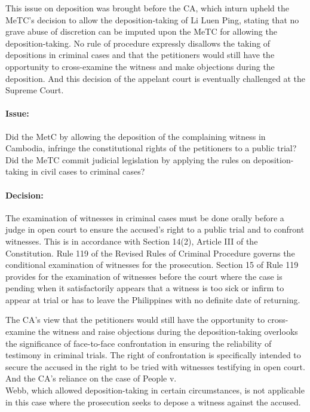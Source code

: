 \documentclass[
12pt,
oneside,
onehalfspacing,
headsepline
]{DigestCollection}
\begin{document}
This issue on deposition was brought before the CA, which inturn upheld the MeTC's decision to allow the deposition-taking of Li Luen Ping, stating that no grave abuse of discretion can be imputed upon the MeTC for allowing the deposition-taking. No rule of procedure expressly disallows the taking of depositions in criminal cases and that the petitioners would still have the opportunity to cross-examine the witness and make objections during the deposition. And this decision of the appelant court is eventually challenged at the Supreme Court.

\paragraph{Issue:}
\label{fa28abc0-09fd-11ef-932c-63c852f65e48}


Did the MetC by allowing the deposition of the complaining witness in Cambodia, infringe the constitutional rights of the petitioners to a public trial? Did the MeTC commit judicial legislation by applying the rules on deposition-taking in civil cases to criminal cases?

\paragraph{Decision:}
\label{fbfafac0-09fd-11ef-932c-63c852f65e48}


The examination of witnesses in criminal cases must be done orally before a judge in open court to ensure the accused's right to a public trial and to confront witnesses. This is in accordance with Section 14(2), Article III of the Constitution. Rule 119 of the Revised Rules of Criminal Procedure governs the conditional examination of witnesses for the prosecution. Section 15 of Rule 119 provides for the examination of witnesses before the court where the case is pending when it satisfactorily appears that a witness is too sick or infirm to appear at trial or has to leave the Philippines with no definite date of returning.

The CA's view that the petitioners would still have the opportunity to cross-examine the witness and raise objections during the deposition-taking overlooks the significance of face-to-face confrontation in ensuring the reliability of testimony in criminal trials. The right of confrontation is specifically intended to secure the accused in the right to be tried with witnesses testifying in open court. And the CA's reliance on the case of People v. \\Webb, which allowed deposition-taking in certain circumstances, is not applicable in this case where the prosecution seeks to depose a witness against the accused. 
\end{document}
